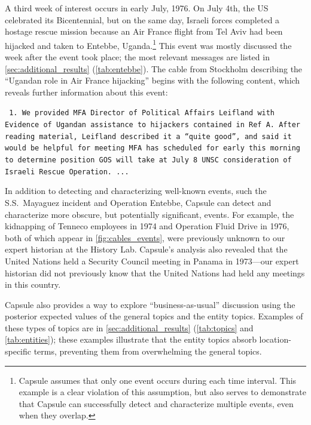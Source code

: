 A third week of interest occurs in early July, 1976.  On July 4th, the
US celebrated its Bicentennial, but on the same day, Israeli forces
completed a hostage rescue mission because an Air France flight from
Tel Aviv had been hijacked and taken to Entebbe,
Uganda.\footnote{Capsule assumes that only one event occurs during
  each time interval. This example is a clear violation of this
  assumption, but also serves to demonstrate that Capsule can
  successfully detect and characterize multiple events, even when they
  overlap.} This event was mostly discussed the week after the event
took place; the most relevant messages are listed in
\cref{sec:additional_results} (\cref{tab:entebbe}). The cable from
Stockholm describing the ``Ugandan role in Air France hijacking''
begins with the following content, which reveals further information
about this event:
\begin{shaded*} \tt{
1. We provided MFA Director of Political Affairs
Leifland with Evidence of Ugandan assistance to
hijackers contained in Ref A.  After reading material,{}
Leifland described it a ``quite good'', and said it{}
would be helpful for meeting MFA has scheduled for
early this morning to determine position GOS will take
at July 8 UNSC consideration of Israeli Rescue Operation. ...
}
\end{shaded*}

In addition to detecting and characterizing well-known events, such
the S.S.~Mayaguez incident and Operation Entebbe, Capsule can detect
and characterize more obscure, but potentially significant,
events. For example, the kidnapping of Tenneco employees in 1974 and
Operation Fluid Drive in 1976, both of which appear in
\cref{fig:cables_events}, were previously unknown to our expert
historian at the History Lab. Capsule's analysis also revealed that
the United Nations held a Security Council meeting in Panama in
1973---our expert historian did not previously know that the United
Nations had held any meetings in this country.

Capsule also provides a way to explore ``business-as-usual''
discussion using the posterior expected values of the general topics
and the entity topics. Examples of these types of topics are in
\cref{sec:additional_results} (\cref{tab:topics} and
\cref{tab:entities}); these examples illustrate that the entity topics
absorb location-specific terms, preventing them from overwhelming the
general topics.

